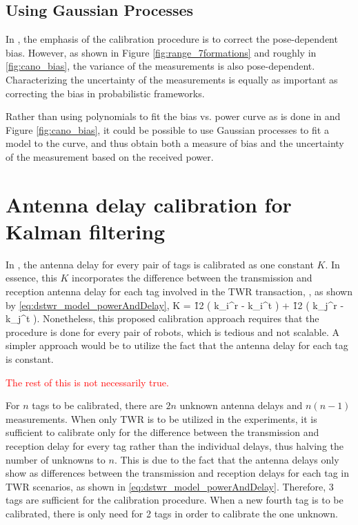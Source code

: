 \documentclass{decar-wsd}    %
\begin{document}
\subsection{Using Gaussian Processes}

In \cite{Cano2022}, the emphasis of the calibration procedure is to correct the pose-dependent bias. However, as shown in Figure \ref{fig:range_7formations} and roughly in \ref{fig:cano_bias}, the variance of the measurements is also pose-dependent. Characterizing the uncertainty of the measurements is equally as important as correcting the bias in probabilistic frameworks.

Rather than using polynomials to fit the bias vs. power curve as is done in \cite{Cano2022} and Figure \ref{fig:cano_bias}, it could be possible to use Gaussian processes to fit a model to the curve, and thus obtain both a measure of bias and the uncertainty of the measurement based on the received power.

\clearpage
\section{Antenna delay calibration for Kalman filtering}

In \cite{Cano2022}, the antenna delay for every pair of tags is calibrated as one constant $K$. In essence, this $K$ incorporates the difference between the transmission and reception antenna delay for each tag involved in the TWR transaction, \ie, as shown by \eqref{eq:dstwr_model_powerAndDelay},
\beq
    K = \f{1}{2} \left( k_i^r - k_i^t \right) + \f{1}{2} \left( k_j^r - k_j^t \right).
\eeq
Nonetheless, this proposed calibration approach requires that the procedure is done for every pair of robots, which is tedious and not scalable. A simpler approach would be to utilize the fact that the antenna delay for each tag is constant. 

\textcolor{red}{The rest of this is not necessarily true.}

For $n$ tags to be calibrated, there are $2n$ unknown antenna delays and $n(n-1)$ measurements. When only TWR is to be utilized in the experiments, it is sufficient to calibrate only for the difference between the transmission and reception delay for every tag rather than the individual delays, thus halving the number of unknowns to $n$. This is due to the fact that the antenna delays only show as differences between the transmission and reception delays for each tag in TWR scenarios, as shown in \eqref{eq:dstwr_model_powerAndDelay}. Therefore, 3 tags are sufficient for the calibration procedure. When a new fourth tag is to be calibrated, there is only need for 2 tags in order to calibrate the one unknown.
\end{document}

